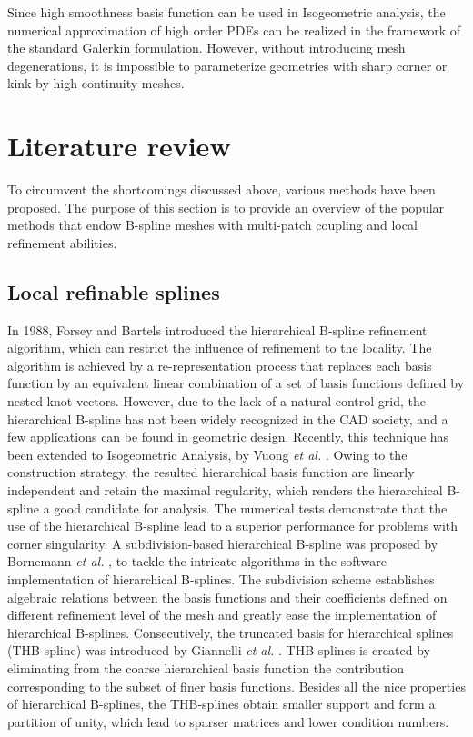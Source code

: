 \documentclass[preprint,12pt]{elsarticle}
\begin{document}
Since high smoothness basis function can be used in Isogeometric analysis, the numerical approximation of high order PDEs can be realized in the framework of the standard Galerkin formulation. However, without introducing mesh degenerations, it is impossible to parameterize geometries with sharp corner or kink by high continuity meshes.

\section{Literature review}
To circumvent the shortcomings discussed above, various methods have been proposed. The purpose of this section is to provide an overview of the popular methods that endow B-spline meshes with multi-patch coupling and local refinement abilities. 
\subsection{Local refinable splines}
In 1988, Forsey and Bartels \cite{forsey_hierarchical_1988} introduced the hierarchical B-spline refinement algorithm, which can restrict the influence of refinement to the locality. The algorithm is achieved by a re-representation process that replaces each basis function by an equivalent linear combination of a set of basis functions defined by nested knot vectors. However, due to the lack of a natural control grid, the hierarchical B-spline has not been widely recognized in the CAD society, and a few applications can be found in geometric design. Recently, this technique has been extended to Isogeometric Analysis, by Vuong \textit{et al.} \cite{vuong_hierarchical_2011}. Owing to the construction strategy, the resulted hierarchical basis function are linearly independent and retain the maximal regularity, which renders the hierarchical B-spline a good candidate for analysis. The numerical tests demonstrate that the use of the hierarchical B-spline lead to a superior performance for problems with corner singularity. A subdivision-based hierarchical B-spline was proposed by Bornemann \textit{et al.} \cite{bornemann_subdivision-based_2013}, to tackle the intricate algorithms in the software implementation of hierarchical B-splines. The subdivision scheme establishes algebraic relations between the basis functions and their coefficients defined on different refinement level of the mesh and greatly ease the implementation of hierarchical B-splines. Consecutively, the truncated basis for hierarchical splines (THB-spline) was introduced by Giannelli \textit{et al.} \cite{giannelli_thb-splines:_2012}. THB-splines is created by eliminating from the coarse hierarchical basis function the contribution corresponding to the subset of finer basis functions. Besides all the nice properties of hierarchical B-splines, the THB-splines obtain smaller support and form a partition of unity, which lead to sparser matrices and lower condition numbers. \par
\end{document}
